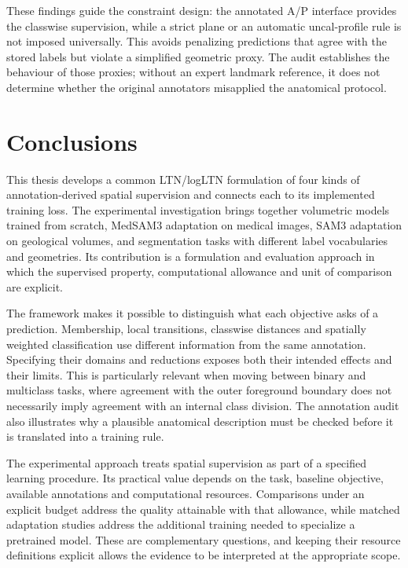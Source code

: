 \documentclass[12pt,a4paper]{article}
\begin{document}
These findings guide the constraint design: the annotated A/P interface
provides the classwise supervision, while a strict plane or an automatic
uncal-profile rule is not imposed universally. This avoids penalizing
predictions that agree with the stored labels but violate a simplified
geometric proxy. The audit establishes the behaviour of those proxies;
without an expert landmark reference, it does not determine whether
the original annotators misapplied the anatomical protocol.




\clearpage

\section{Conclusions}\label{sec:conclusions}

This thesis develops a common LTN/logLTN formulation of four kinds of
annotation-derived spatial supervision and connects each to its
implemented training loss. The experimental investigation brings together
volumetric models trained from scratch, MedSAM3 adaptation on medical
images, SAM3 adaptation on geological volumes, and segmentation tasks
with different label vocabularies and geometries. Its contribution is a
formulation and evaluation approach in which the supervised property,
computational allowance and unit of comparison are explicit.

The framework makes it possible to distinguish what each objective asks
of a prediction. Membership, local transitions, classwise distances and
spatially weighted classification use different information from the
same annotation. Specifying their domains and reductions exposes both
their intended effects and their limits. This is particularly relevant
when moving between binary and multiclass tasks, where agreement with
the outer foreground boundary does not necessarily imply agreement
with an internal class division. The annotation audit also illustrates
why a plausible anatomical description must be checked before it is
translated into a training rule.

The experimental approach treats spatial supervision as part of a
specified learning procedure. Its practical value depends on the task,
baseline objective, available annotations and computational resources.
Comparisons under an explicit budget address the quality attainable
with that allowance, while matched adaptation studies address the
additional training needed to specialize a pretrained model. These are
complementary questions, and keeping their resource definitions explicit
allows the evidence to be interpreted at the appropriate scope.
\end{document}
